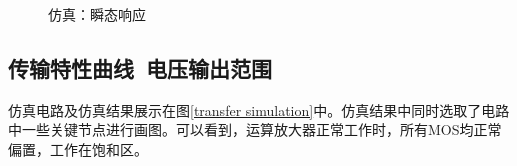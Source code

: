 \documentclass[UTF8]{ctexart}
\numberwithin{figure}{subsection}
\numberwithin{table}{subsection}
\numberwithin{equation}{subsection}
\begin{document}
\begin{figure}[H]
    \centering
    \caption{仿真：瞬态响应}
    \label{trans simulation}
\end{figure}

\subsection{传输特性曲线\ 电压输出范围}
仿真电路及仿真结果展示在图\ref{transfer simulation}中。仿真结果中同时选取了电路中一些关键节点进行画图。可以看到，运算放大器正常工作时，所有MOS均正常偏置，工作在饱和区。
\end{document}
